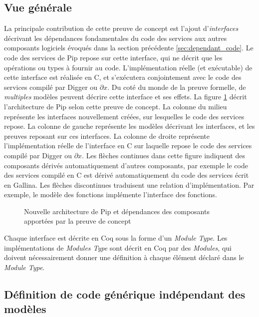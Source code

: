 		\subsection{Vue générale}

		La principale contribution de cette preuve de concept est l'ajout d'\emph{interfaces} décrivant les dépendances fondamentales du code des services aux autres composants logiciels évoqués dans la section précédente \ref{sec:dependant_code}. Le code des services de Pip repose sur cette interface, qui ne décrit que les opérations ou types à fournir au code. L'implémentation réelle (et exécutable) de cette interface est réalisée en C, et s'exécutera conjointement avec le code des services compilé par Digger ou $\partial x$. Du coté du monde de la preuve formelle, de \emph{multiples} modèles peuvent décrire cette interface et ses effets. La figure \ref{fig:new_pip_architecture} décrit l'architecture de Pip selon cette preuve de concept. La colonne du milieu représente les interfaces nouvellement créées, sur lesquelles le code des services repose. La colonne de gauche représente les modèles décrivant les interfaces, et les preuves reposant sur ces interfaces. La colonne de droite représente l'implémentation réelle de l'interface en C sur laquelle repose le code des services compilé par Digger ou $\partial x$. Les flèches continues dans cette figure indiquent des composants dérivés automatiquement d'autres composants, par exemple le code des services compilé en C est dérivé automatiquement du code des services écrit en Gallina. Les flèches discontinues traduisent une relation d'implémentation. Par exemple, le modèle des fonctions implémente l'interface des fonctions.

			\begin{figure}[!ht]
				
				\caption{Nouvelle architecture de Pip et dépendances des composants apportées par la preuve de concept}
				\label{fig:new_pip_architecture}
			\end{figure}

			Chaque interface est décrite en Coq sous la forme d'un \emph{Module Type}. Les implémentations de \emph{Modules Type} sont décrit en Coq par des \emph{Modules}, qui doivent nécessairement donner une définition à chaque élément déclaré dans le \emph{Module Type}.

		\subsection{Définition de code générique indépendant des modèles}

